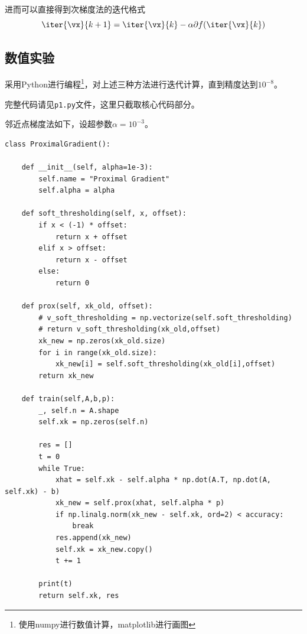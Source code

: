\documentclass[logo,reportComp]{thesis}
\begin{document}
进而可以直接得到次梯度法的迭代格式
\begin{equation}
\iter{\vx}{k+1}=\iter{\vx}{k}-\alpha\partial f(\iter{\vx}{k})
\end{equation}

\subsection{数值实验}
采用Python进行编程\footnote{使用numpy进行数值计算，matplotlib进行画图}，对上述三种方法进行迭代计算，直到精度达到$10^{-8}$。

完整代码请见\verb'p1.py'文件，这里只截取核心代码部分。

邻近点梯度法如下，设超参数$\alpha=10^{-3}$。
\begin{lstlisting}
class ProximalGradient():

	def __init__(self, alpha=1e-3):
		self.name = "Proximal Gradient"
		self.alpha = alpha

	def soft_thresholding(self, x, offset):
		if x < (-1) * offset:
			return x + offset
		elif x > offset:
			return x - offset
		else:
			return 0

	def prox(self, xk_old, offset):
		# v_soft_thresholding = np.vectorize(self.soft_thresholding)
		# return v_soft_thresholding(xk_old,offset)
		xk_new = np.zeros(xk_old.size)
		for i in range(xk_old.size):
			xk_new[i] = self.soft_thresholding(xk_old[i],offset)
		return xk_new

	def train(self,A,b,p):
		_, self.n = A.shape
		self.xk = np.zeros(self.n)

		res = []
		t = 0
		while True:
			xhat = self.xk - self.alpha * np.dot(A.T, np.dot(A, self.xk) - b)
			xk_new = self.prox(xhat, self.alpha * p)
			if np.linalg.norm(xk_new - self.xk, ord=2) < accuracy:
				break
			res.append(xk_new)
			self.xk = xk_new.copy()
			t += 1

		print(t)
		return self.xk, res
\end{lstlisting}
\end{document}
